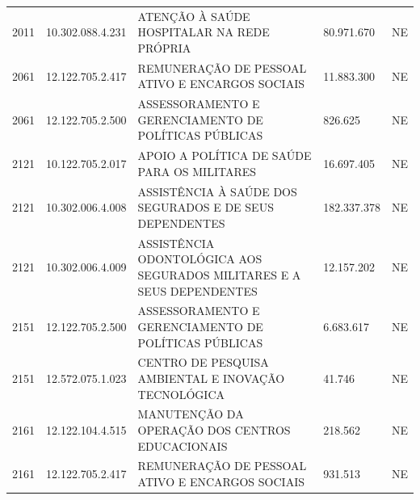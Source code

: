 \documentclass{article}
\begin{document}
\begin{longtable}[c]{m{1cm}|m{2cm}|m{10cm}|m{2cm}|m{1cm}}
\multicolumn{1}{C{1cm}|}{2011} & \multicolumn{1}{C{2cm}|}{10.302.088.4.231} & \multicolumn{1}{L{10cm}|}{ATENÇÃO À SAÚDE HOSPITALAR NA REDE PRÓPRIA} & \multicolumn{1}{R{2cm}|}{80.971.670} & \multicolumn{1}{C{1cm}}{NE} \\
\multicolumn{1}{C{1cm}|}{2061} & \multicolumn{1}{C{2cm}|}{12.122.705.2.417} & \multicolumn{1}{L{10cm}|}{REMUNERAÇÃO DE PESSOAL ATIVO E ENCARGOS SOCIAIS} & \multicolumn{1}{R{2cm}|}{11.883.300} & \multicolumn{1}{C{1cm}}{NE} \\
\multicolumn{1}{C{1cm}|}{2061} & \multicolumn{1}{C{2cm}|}{12.122.705.2.500} & \multicolumn{1}{L{10cm}|}{ASSESSORAMENTO E GERENCIAMENTO DE POLÍTICAS PÚBLICAS} & \multicolumn{1}{R{2cm}|}{826.625} & \multicolumn{1}{C{1cm}}{NE} \\
\multicolumn{1}{C{1cm}|}{2121} & \multicolumn{1}{C{2cm}|}{10.122.705.2.017} & \multicolumn{1}{L{10cm}|}{APOIO A POLÍTICA DE SAÚDE PARA OS MILITARES} & \multicolumn{1}{R{2cm}|}{16.697.405} & \multicolumn{1}{C{1cm}}{NE} \\
\multicolumn{1}{C{1cm}|}{2121} & \multicolumn{1}{C{2cm}|}{10.302.006.4.008} & \multicolumn{1}{L{10cm}|}{ASSISTÊNCIA À SAÚDE DOS SEGURADOS E DE SEUS DEPENDENTES} & \multicolumn{1}{R{2cm}|}{182.337.378} & \multicolumn{1}{C{1cm}}{NE} \\
\multicolumn{1}{C{1cm}|}{2121} & \multicolumn{1}{C{2cm}|}{10.302.006.4.009} & \multicolumn{1}{L{10cm}|}{ASSISTÊNCIA ODONTOLÓGICA AOS SEGURADOS MILITARES E A SEUS DEPENDENTES} & \multicolumn{1}{R{2cm}|}{12.157.202} & \multicolumn{1}{C{1cm}}{NE} \\
\multicolumn{1}{C{1cm}|}{2151} & \multicolumn{1}{C{2cm}|}{12.122.705.2.500} & \multicolumn{1}{L{10cm}|}{ASSESSORAMENTO E GERENCIAMENTO DE POLÍTICAS PÚBLICAS} & \multicolumn{1}{R{2cm}|}{6.683.617} & \multicolumn{1}{C{1cm}}{NE} \\
\multicolumn{1}{C{1cm}|}{2151} & \multicolumn{1}{C{2cm}|}{12.572.075.1.023} & \multicolumn{1}{L{10cm}|}{CENTRO DE PESQUISA AMBIENTAL E INOVAÇÃO TECNOLÓGICA} & \multicolumn{1}{R{2cm}|}{41.746} & \multicolumn{1}{C{1cm}}{NE} \\
\multicolumn{1}{C{1cm}|}{2161} & \multicolumn{1}{C{2cm}|}{12.122.104.4.515} & \multicolumn{1}{L{10cm}|}{MANUTENÇÃO DA OPERAÇÃO DOS CENTROS EDUCACIONAIS} & \multicolumn{1}{R{2cm}|}{218.562} & \multicolumn{1}{C{1cm}}{NE} \\
\multicolumn{1}{C{1cm}|}{2161} & \multicolumn{1}{C{2cm}|}{12.122.705.2.417} & \multicolumn{1}{L{10cm}|}{REMUNERAÇÃO DE PESSOAL ATIVO E ENCARGOS SOCIAIS} & \multicolumn{1}{R{2cm}|}{931.513} & \multicolumn{1}{C{1cm}}{NE} \\

\end{longtable}
\end{document}
